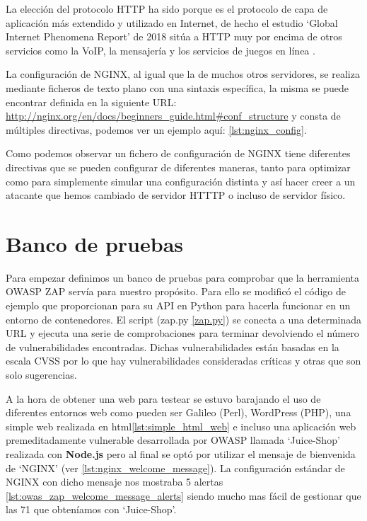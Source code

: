 \bigskip
La elección del protocolo HTTP ha sido porque es el protocolo de capa de aplicación más extendido y utilizado en Internet, de hecho el estudio `Global Internet Phenomena Report' de 2018 sitúa a HTTP muy por encima de otros servicios como la VoIP, la mensajería y los servicios de juegos en línea \cite{sandvine_2018_2018}.

\bigskip
La configuración de NGINX, al igual que la de muchos otros servidores, se realiza mediante ficheros de texto plano con una sintaxis específica, la misma se puede encontrar definida en la siguiente URL: \url{http://nginx.org/en/docs/beginners_guide.html#conf_structure} y consta de múltiples directivas, podemos ver un ejemplo aquí: \ref{lst:nginx_config}.

Como podemos observar un fichero de configuración de NGINX tiene diferentes directivas que se pueden configurar de diferentes maneras, tanto para optimizar como para simplemente simular una configuración distinta y así hacer creer a un atacante que hemos cambiado de servidor HTTTP o incluso de servidor físico.

\section{Banco de pruebas}

Para empezar definimos un banco de pruebas para comprobar que la herramienta OWASP ZAP servía para nuestro propósito. Para ello se modificó el código de ejemplo que proporcionan para su API en Python para hacerla funcionar en un entorno de contenedores. El script (zap.py \ref{zap.py}) se conecta a una determinada URL y ejecuta una serie de comprobaciones para terminar devolviendo el número de vulnerabilidades encontradas. Dichas vulnerabilidades están basadas en la escala CVSS por lo que hay vulnerabilidades consideradas críticas y otras que son solo sugerencias.

\bigskip
A la hora de obtener una web para testear se estuvo barajando el uso de diferentes entornos web como pueden ser Galileo (Perl), WordPress (PHP), una simple web realizada en html\ref{lst:simple_html_web} e incluso una aplicación web premeditadamente vulnerable desarrollada por OWASP llamada `Juice-Shop' realizada con \textbf{Node.js} pero al final se optó por utilizar el mensaje de bienvenida de `NGINX' (ver \ref{lst:nginx_welcome_message}). La configuración estándar de NGINX con dicho mensaje nos mostraba 5 alertas \ref{lst:owas_zap_welcome_message_alerts} siendo mucho mas fácil de gestionar que las 71 que obteníamos con `Juice-Shop'.

